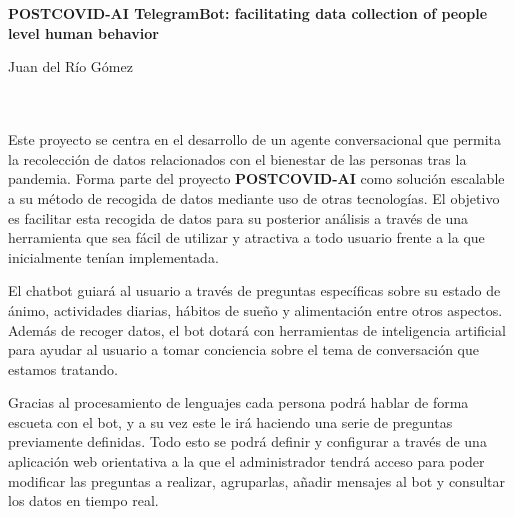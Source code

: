 \chapter*{}
\thispagestyle{empty}


\begin{center}
{\large\bfseries POSTCOVID-AI TelegramBot: facilitating data collection of people level human behavior }\\
\end{center}
\begin{center}
Juan del Río Gómez\\
\end{center}
\vspace{0.7cm}
\\

\vspace{0.7cm}
\\

Este proyecto se centra en el desarrollo de un agente conversacional que permita la
recolección de datos relacionados con el bienestar de las personas tras la pandemia. Forma parte del proyecto {\bfseries POSTCOVID-AI} como solución escalable a su método de recogida de datos mediante uso de otras tecnologías. El objetivo es facilitar esta recogida de datos para su posterior análisis a través de una herramienta que sea fácil de utilizar y atractiva a todo usuario frente a la que inicialmente tenían implementada.\vspace{0.3cm}

El chatbot guiará al usuario a través de preguntas específicas sobre su estado de ánimo,
actividades diarias, hábitos de sueño y alimentación entre otros aspectos. Además de recoger
datos, el bot dotará con herramientas de inteligencia artificial para ayudar al usuario a tomar
conciencia sobre el tema de conversación que estamos tratando.\vspace{0.3cm}

Gracias al procesamiento de lenguajes cada persona podrá hablar de forma escueta con el bot,
y a su vez este le irá haciendo una serie de preguntas previamente definidas. Todo esto se podrá definir y configurar a través de una aplicación web orientativa a la que el administrador tendrá acceso para poder
modificar las preguntas a realizar, agruparlas, añadir mensajes al bot y consultar los datos en tiempo real.


\cleardoublepage
\thispagestyle{empty}

